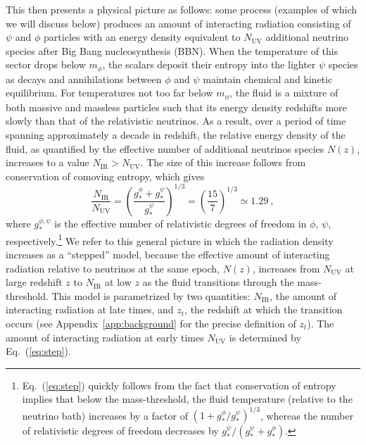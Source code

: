 \documentclass[aps,prd,twocolumn,nofootinbib,superscriptaddress]{revtex4}
\newcommand{\Eq}[1]{Eq.~(\ref{eq:#1})}
\newcommand{\App}[1]{Appendix~\ref{app:#1}}
\newcommand{\nir}{N_\text{IR}}
\newcommand{\nuv}{N_\text{UV}}
\newcommand{\be}{\begin{equation}}
\newcommand{\ee}{\end{equation}}
\newcommand{\zt}{z_t}
\begin{document}
This then presents a physical picture as follows: some process (examples of which we will discuss below) produces an amount of interacting radiation consisting of $\psi$ and $\phi$ particles with an energy density equivalent to $\nuv$ additional neutrino species after Big Bang nucleosynthesis (BBN). When the temperature of this sector drops below $m_\phi$, the scalars deposit their entropy into the lighter $\psi$ species as decays and annihilations between $\phi$ and $\psi$ maintain chemical and kinetic equilibrium. 
For temperatures not too far below $m_\phi$, the fluid is a mixture of both massive and massless particles such that its energy density redshifts more slowly than that of the relativistic neutrinos. As a result, over a period of time spanning approximately a decade in redshift, the relative energy density of the fluid, as quantified by the effective number of additional neutrinos species $N(z)$, increases to a value $\nir > \nuv$.
The size of this increase follows from conservation of comoving entropy, which gives
\be
\label{eq:step}
\frac{\nir}{\nuv }
= \left(\frac{g_*^\phi +g_*^\psi}{g_*^\psi}\right)^{1/3} =\left(\frac{15}{7}\right)^{1/3}\simeq 1.29
~,
\ee
where $g_*^{\phi, \psi}$ is the effective number of relativistic degrees of freedom in $\phi$, $\psi$, respectively.\footnote{\Eq{step} quickly follows from the fact that conservation of entropy implies that below the mass-threshold, the fluid temperature (relative to the neutrino bath) increases by a factor of $(1+g_*^\phi/g_*^\psi)^{1/3}$, whereas the number of relativistic degrees of freedom decreases by $g_*^\psi/(g_*^\psi+ g_*^\phi)$.} We refer to this general picture in which the radiation density increases as a ``stepped'' model, because the effective amount of interacting radiation relative to neutrinos at the same epoch, $N(z)$, increases from $\nuv$ at large redshift $z$ to $\nir$ at low $z$ as the fluid transitions through the mass-threshold. This model is parametrized by two quantities: $\nir$, the amount of interacting radiation at late times, and $\zt$, the redshift at which the transition occurs (see \App{background} for the precise definition of $z_t$). The amount of interacting radiation at early times $\nuv$ is determined by  \Eq{step}.
\end{document}
